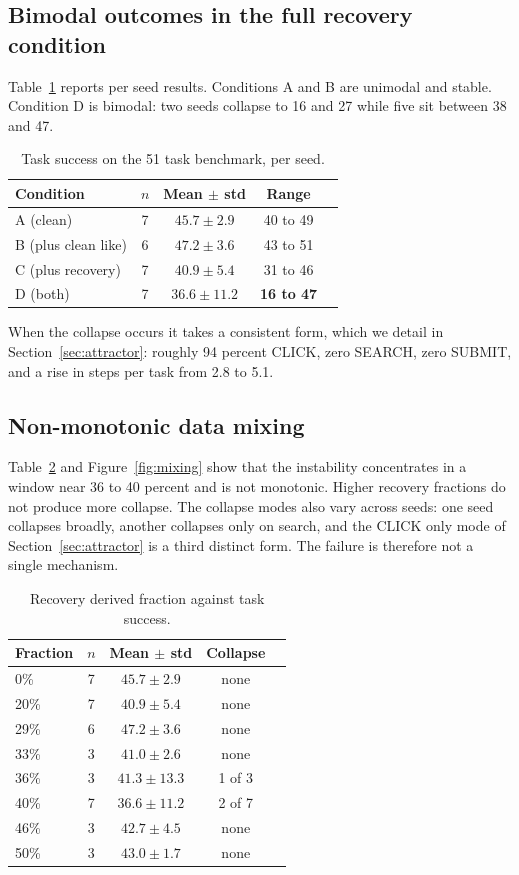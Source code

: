 \documentclass[11pt]{article}
\begin{document}
\subsection{Bimodal outcomes in the full recovery condition}
Table~\ref{tab:seeds} reports per seed results. Conditions A and B are unimodal
and stable. Condition D is bimodal: two seeds collapse to 16 and 27 while five
sit between 38 and 47.

\begin{table}[h]
\centering
\caption{Task success on the 51 task benchmark, per seed.}
\label{tab:seeds}
\begin{tabular}{lcccc}
\toprule
Condition & $n$ & Mean $\pm$ std & Range \\
\midrule
A (clean) & 7 & $45.7 \pm 2.9$ & 40 to 49 \\
B (plus clean like) & 6 & $47.2 \pm 3.6$ & 43 to 51 \\
C (plus recovery) & 7 & $40.9 \pm 5.4$ & 31 to 46 \\
D (both) & 7 & $36.6 \pm 11.2$ & \textbf{16 to 47} \\
\bottomrule
\end{tabular}
\end{table}

When the collapse occurs it takes a consistent form, which we detail in
Section~\ref{sec:attractor}: roughly 94 percent CLICK, zero SEARCH, zero SUBMIT,
and a rise in steps per task from 2.8 to 5.1.

\subsection{Non-monotonic data mixing}
Table~\ref{tab:mix} and Figure~\ref{fig:mixing} show that the instability
concentrates in a window near 36 to 40 percent and is not monotonic. Higher
recovery fractions do not produce more collapse. The collapse modes also vary
across seeds: one seed collapses broadly, another collapses only on search, and
the CLICK only mode of Section~\ref{sec:attractor} is a third distinct form. The
failure is therefore not a single mechanism.

\begin{table}[h]
\centering
\caption{Recovery derived fraction against task success.}
\label{tab:mix}
\begin{tabular}{lcccc}
\toprule
Fraction & $n$ & Mean $\pm$ std & Collapse \\
\midrule
0\% & 7 & $45.7 \pm 2.9$ & none \\
20\% & 7 & $40.9 \pm 5.4$ & none \\
29\% & 6 & $47.2 \pm 3.6$ & none \\
33\% & 3 & $41.0 \pm 2.6$ & none \\
36\% & 3 & $41.3 \pm 13.3$ & 1 of 3 \\
40\% & 7 & $36.6 \pm 11.2$ & 2 of 7 \\
46\% & 3 & $42.7 \pm 4.5$ & none \\
50\% & 3 & $43.0 \pm 1.7$ & none \\
\bottomrule
\end{tabular}
\end{table}
\end{document}
